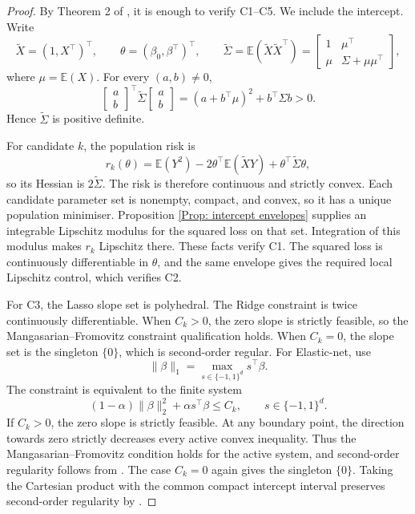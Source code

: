 \documentclass[12pt]{article}
\newenvironment{bluechange}{\begingroup\color[rgb]{0.00,0.00,1.00}}{\endgroup}
\theoremstyle{remark}
\theoremstyle{plain}
\begin{document}
\begin{bluechange}
\begin{proof}
By Theorem 2 of \citet{nguyen_panic:_2023}, it is enough to verify C1--C5. We include the intercept. Write
\[
\widetilde X=(1,X^\top)^\top,
\qquad
\theta=(\beta_0,\beta^\top)^\top,
\qquad
\widetilde\Sigma=\mathbb E(\widetilde X\widetilde X^\top)
=\begin{bmatrix}1&\mu^\top\\ \mu&\Sigma+\mu\mu^\top\end{bmatrix},
\]
where $\mu=\mathbb E(X)$. For every $(a,b)\ne0$,
\[
\begin{bmatrix}a\\ b\end{bmatrix}^{\!\top}
\widetilde\Sigma
\begin{bmatrix}a\\ b\end{bmatrix}
=(a+b^\top\mu)^2+b^\top\Sigma b>0.
\]
Hence $\widetilde\Sigma$ is positive definite.

For candidate $k$, the population risk is
\[
r_k(\theta)=\mathbb E(Y^2)-2\theta^\top\mathbb E(\widetilde X Y)
+\theta^\top\widetilde\Sigma\theta,
\]
so its Hessian is $2\widetilde\Sigma$. The risk is therefore continuous and strictly convex. Each candidate parameter set is nonempty, compact, and convex, so it has a unique population minimiser. Proposition \ref{Prop: intercept envelopes} supplies an integrable Lipschitz modulus for the squared loss on that set. Integration of this modulus makes $r_k$ Lipschitz there. These facts verify C1. The squared loss is continuously differentiable in $\theta$, and the same envelope gives the required local Lipschitz control, which verifies C2.

For C3, the Lasso slope set is polyhedral. The Ridge constraint is twice continuously differentiable. When $C_k>0$, the zero slope is strictly feasible, so the Mangasarian--Fromovitz constraint qualification holds. When $C_k=0$, the slope set is the singleton $\{0\}$, which is second-order regular. For Elastic-net, use
\[
\|\beta\|_1=\max_{s\in\{-1,1\}^d}s^\top\beta.
\]
The constraint is equivalent to the finite system
\[
(1-\alpha)\|\beta\|_2^2+\alpha s^\top\beta\le C_k,
\qquad s\in\{-1,1\}^d.
\]
If $C_k>0$, the zero slope is strictly feasible. At any boundary point, the direction towards zero strictly decreases every active convex inequality. Thus the Mangasarian--Fromovitz condition holds for the active system, and second-order regularity follows from \citet[Proposition 3.88]{bonnans_perturbation_2000}. The case $C_k=0$ again gives the singleton $\{0\}$. Taking the Cartesian product with the common compact intercept interval preserves second-order regularity by \citet[Proposition 3.89]{bonnans_perturbation_2000}.


\end{proof}
\end{bluechange}
\end{document}
